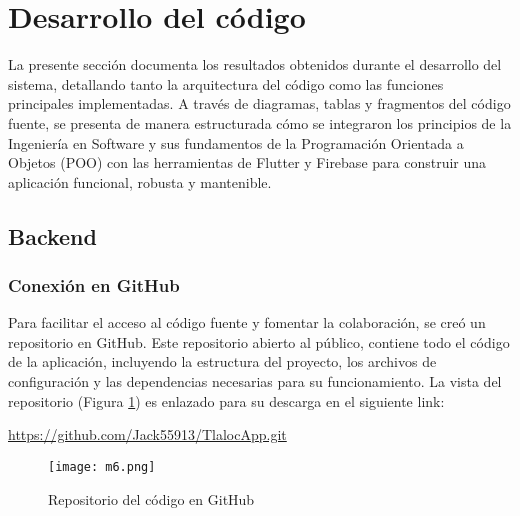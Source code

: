 




\newpage
\section{Desarrollo del código}
\label{cap_desarrollodelcodigo}
La presente sección documenta los resultados obtenidos durante el desarrollo del sistema, detallando tanto la arquitectura del código como las funciones principales implementadas. A través de diagramas, tablas y fragmentos del código fuente, se presenta de manera estructurada cómo se integraron los principios de la Ingeniería en Software y sus fundamentos de la Programación Orientada a Objetos (POO) con las herramientas de Flutter y Firebase para construir una aplicación funcional, robusta y mantenible.
\subsection{Backend}

\subsubsection{Conexión en GitHub}
Para facilitar el acceso al código fuente y fomentar la colaboración, se creó un repositorio en GitHub. Este repositorio abierto al público, contiene todo el código de la aplicación, incluyendo la estructura del proyecto, los archivos de configuración y las dependencias necesarias para su funcionamiento. La vista del repositorio (Figura \ref{m6}) es enlazado para su descarga en el siguiente link:
\begin{center}
  \url{https://github.com/Jack55913/TlalocApp.git}
\end{center}

\begin{figure}[ht]
\centering
  \texttt{[image: m6.png]}
  \caption{Repositorio del código en GitHub}
  \label{m6}
\end{figure}






